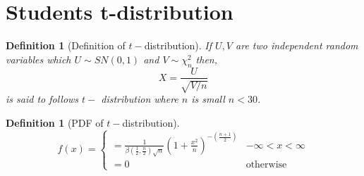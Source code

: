 \documentclass[oneside,11pt,pdftex]{book}%
\numberwithin{equation}{section}
\newtheorem{definition}[theorem]{Definition}
\numberwithin{section}{chapter}
\numberwithin{equation}{chapter}
\begin{document}
\section{Students t-distribution}
\begin{definition}[Definition of $ t- $distribution]
	If $ U, V$ are two independent random variables which $ U \sim SN(0,1) $ and $ V\sim \chi^2_n $ then,
	\[ X=\frac{U}{\sqrt{V/n}} \] is said to follows $ t- $ distribution where $ n  $ is small $ n<30 $.
\end{definition}

\begin{definition}[PDF of $ t-$distribution]
	\[ f(x)=\begin{cases}
		=\frac{1}{\beta\left(\frac{1}{2}, \frac{n}{2}\right)\sqrt{n}} \left(1+ \frac{x^2}{n}\right)^{-\left(\frac{n+1}{2}\right)} & -\infty < x <\infty\\
		=0 & \text{otherwise}
	\end{cases} \]
\end{definition}
\end{document}
